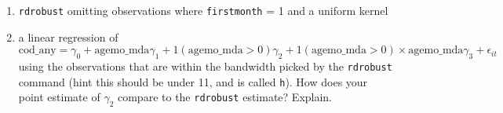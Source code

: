 \documentclass[11pt, a4paper]{article}
\begin{document}
\begin{enumerate}
\begin{enumerate}
    \begin{enumerate}
    \item \texttt{rdrobust} omitting observations where \texttt{firstmonth} = 1 and a uniform kernel
    \item     a linear regression of
    \begin{equation}
      \text{cod\_any} = \gamma_0 + \text{agemo\_mda}\gamma_{1} + 1(\text{agemo\_mda} > 0)\gamma_{2} + 1(\text{agemo\_mda} > 0)\times \text{agemo\_mda}\gamma_{3} + \epsilon_{it}
    \end{equation}
    using the observations that are within the bandwidth picked by the
    \texttt{rdrobust} command (hint this should be under 11, and is
    called \texttt{h}). How does your point estimate of $\gamma_{2}$
    compare to the \texttt{rdrobust} estimate? Explain.
  \end{enumerate}
\end{enumerate}
\end{enumerate}
\end{document}
